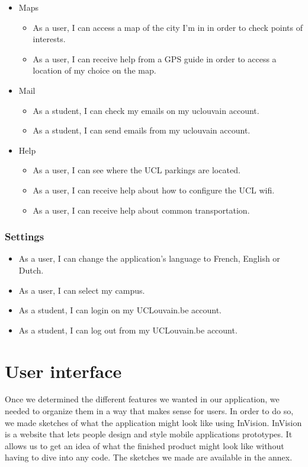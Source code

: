 \documentclass[11pt, a4paper]{report}
\begin{document}
\begin{itemize}
\item Maps
\begin{itemize}
\item As a user, I can access a map of the city I'm in in order to check points of interests.
\item As a user, I can receive help from a GPS guide in order to access a location of my choice on the map.
\end{itemize}
\item Mail
\begin{itemize}
\item As a student, I can check my emails on my uclouvain account.
\item As a student, I can send emails from my uclouvain account.
\end{itemize}
\item{Help}
\begin{itemize}
\item As a user, I can see where the UCL parkings are located.
\item As a user, I can receive help about how to configure the UCL wifi.
\item As a user, I can receive help about common transportation.
\end{itemize}
\end{itemize}

\subsubsection{Settings}

\begin{itemize}
\item As a user, I can change the application's language to French, English or Dutch.
\item As a user, I can select my campus.
\item As a student, I can login on my UCLouvain.be account.
\item As a student, I can log out from my UCLouvain.be account. 
\end{itemize}

\section{User interface}

Once we determined the different features we wanted in our application, we needed to organize them in a way that makes sense for users. In order to do so, we made sketches of what the application might look like using InVision. InVision is a website that lets people design and style mobile applications prototypes. It allows us to get an idea of what the finished product might look like without having to dive into any code. The sketches we made are available in the annex.\\
\end{document}
